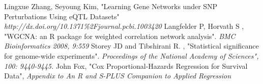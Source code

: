 \documentclass{ba-kecs}
\numberwithin{figure}{section}
\numberwithin{equation}{section}
\begin{document}



\begin{thebibliography}{99}
 Lingxue Zhang, Seyoung Kim, "Learning Gene Networks under SNP Perturbations Using eQTL Datasets" \emph{http://dx.doi.org/10.1371\%2Fjournal.pcbi.1003420}
 Langfelder P, Horvath S , "WGCNA: an R package for weighted correlation network analysis". \emph{BMC Bioinformatics 2008, 9:559}
 Storey JD and Tibshirani R. , "Statistical significance for genome-wide experiments".\emph{ Proceedings of the National Academy of Sciences", 100: 9440-9445.}
 John Fox, "Cox Proportional-Hazards Regression for Survival Data", \emph{Appendix to An R and S-PLUS Companion to Applied Regression}

\end{thebibliography}

\appendix
\end{document}
